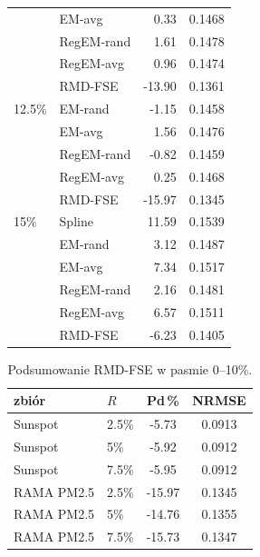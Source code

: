 \begin{table}[htbp]
\begin{minipage}[t]{0.48\textwidth}
\begin{tabular}{llrr}
     & EM-avg & 0.33 & 0.1468 \\
     & RegEM-rand & 1.61 & 0.1478 \\
     & RegEM-avg & 0.96 & 0.1474 \\
     & RMD-FSE & -13.90 & 0.1361 \\
    \hline
    12.5\% & EM-rand & -1.15 & 0.1458 \\
     & EM-avg & 1.56 & 0.1476 \\
     & RegEM-rand & -0.82 & 0.1459 \\
     & RegEM-avg & 0.25 & 0.1468 \\
     & RMD-FSE & -15.97 & 0.1345 \\
    \hline
    15\% & Spline & 11.59 & 0.1539 \\
     & EM-rand & 3.12 & 0.1487 \\
     & EM-avg & 7.34 & 0.1517 \\
     & RegEM-rand & 2.16 & 0.1481 \\
     & RegEM-avg & 6.57 & 0.1511 \\
     & RMD-FSE & -6.23 & 0.1405\\
    \hline
    \end{tabular}
  \end{minipage}
\end{table}

\begin{table}[htbp]
  \centering
  \caption{Podsumowanie RMD-FSE w pasmie 0--10\%.}
  \label{tab:rule02-rmd-focus}
  \begin{tabular}{llcc}
    \hline
    zbiór & $R$ & Pd\,\% & NRMSE \\
    \hline
    Sunspot & 2.5\% & -5.73 & 0.0913 \\
    Sunspot & 5\% & -5.92 & 0.0912 \\
    Sunspot & 7.5\% & -5.95 & 0.0912 \\
    RAMA PM2.5 & 2.5\% & -15.97 & 0.1345 \\
    RAMA PM2.5 & 5\% & -14.76 & 0.1355 \\
    RAMA PM2.5 & 7.5\% & -15.73 & 0.1347 \\
    \hline
  \end{tabular}
\end{table}


